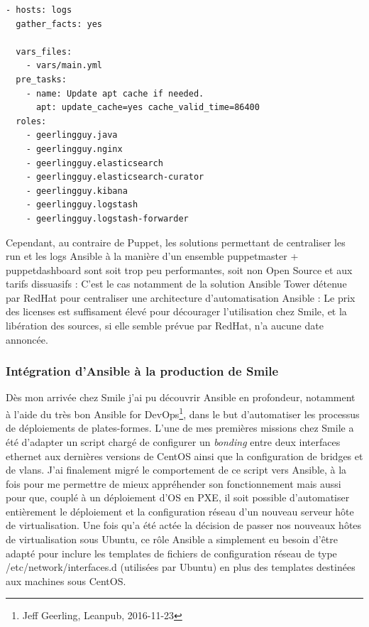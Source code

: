 \documentclass[14 pt,a4paper]{extreport}
\begin{document}
\begin{framed}
\begin{Verbatim}[fontsize=\scriptsize]
- hosts: logs
  gather_facts: yes
  
  vars_files:
    - vars/main.yml
  pre_tasks:
    - name: Update apt cache if needed.
	  apt: update_cache=yes cache_valid_time=86400
  roles:
    - geerlingguy.java
	- geerlingguy.nginx
	- geerlingguy.elasticsearch
	- geerlingguy.elasticsearch-curator
	- geerlingguy.kibana
	- geerlingguy.logstash
	- geerlingguy.logstash-forwarder
\end{Verbatim}
\end{framed}

Cependant, au contraire de Puppet, les solutions permettant de centraliser les run et les logs Ansible à la manière d'un ensemble puppetmaster + puppetdashboard sont soit trop peu performantes, soit non Open Source et aux tarifs dissuasifs : C'est le cas notamment de la solution Ansible Tower détenue par RedHat pour centraliser une architecture d'automatisation Ansible : Le prix des licenses est suffisament élevé pour décourager l'utilisation chez Smile, et la libération des sources, si elle semble prévue par RedHat, n'a aucune date annoncée.

\subsubsection{Intégration d'Ansible à la production de Smile}

Dès mon arrivée chez Smile j'ai pu découvrir Ansible en profondeur, notamment à l'aide du très bon Ansible for DevOps\footnote{Jeff Geerling, Leanpub, 2016-11-23}, dans le but d'automatiser les processus de déploiements de plates-formes. L'une de mes premières missions chez Smile a été d'adapter un script chargé de configurer un \emph{bonding} entre deux interfaces ethernet aux dernières versions de CentOS ainsi que la configuration de bridges et de vlans. J'ai finalement migré le comportement de ce script vers Ansible, à la fois pour me permettre de mieux appréhender son fonctionnement mais aussi pour que, couplé à un déploiement d'OS en PXE, il soit possible d'automatiser entièrement le déploiement et la configuration réseau d'un nouveau serveur hôte de virtualisation. Une fois qu'a été actée la décision de passer nos nouveaux hôtes de virtualisation sous Ubuntu, ce rôle Ansible a simplement eu besoin d'être adapté pour inclure les templates de fichiers de configuration réseau de type /etc/network/interfaces.d (utilisées par Ubuntu) en plus des templates destinées aux machines sous CentOS.
\end{document}
